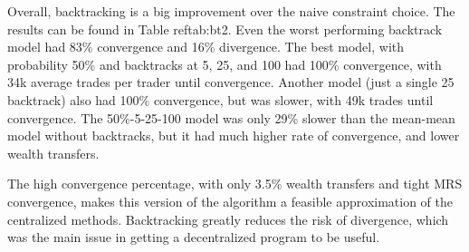 \documentclass[12pt,a4paper,titlepage]{article}
\begin{document}
Overall, backtracking is a big improvement over the naive constraint choice.
The results can be found in Table ref{tab:bt2}.
Even the worst performing backtrack model had 83\% convergence and 16\% divergence.
The best model, with probability 50\% and backtracks at 5, 25, and 100 had 100\% convergence, with 34k average trades per trader until convergence.
Another model (just a single 25 backtrack) also had 100\% convergence, but was slower, with 49k trades until convergence.
The 50\%-5-25-100 model was only 29\% slower than the mean-mean model without backtracks, but it had much higher rate of convergence, and lower wealth transfers.

The high convergence percentage, with only 3.5\% wealth transfers and tight MRS convergence, makes this version of the algorithm a feasible approximation of the centralized methods. 
Backtracking greatly reduces the risk of divergence, which was the main issue in getting a decentralized program to be useful.
\end{document}
